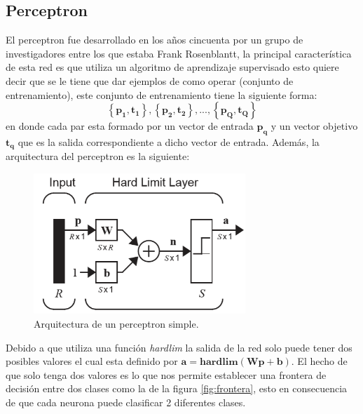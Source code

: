 \documentclass[12pt, titlepage]{article}
\begin{document}
        \subsection{Perceptron}
        El perceptron fue desarrollado en los años cincuenta por un grupo de investigadores entre los que estaba Frank Rosenblantt, la principal característica de esta red es que utiliza un algoritmo de aprendizaje supervisado esto quiere decir que se le tiene que dar ejemplos de como operar (conjunto de entrenamiento), este conjunto de entrenamiento tiene la siguiente forma:
        \[ \left\lbrace \boldsymbol{p_1, t_1}\right\rbrace , \left\lbrace \boldsymbol{p_2, t_2}\right\rbrace , ... , \left\lbrace \boldsymbol{p_Q, t_Q}\right\rbrace  \]
        en donde cada par esta formado por un vector de entrada $\boldsymbol{p_q}$ y un vector objetivo $\boldsymbol{t_q}$ que es la salida correspondiente a dicho vector de entrada. \cite{libro1}
        Además, la arquitectura del perceptron es la siguiente:
        \begin{figure}[H]
            \begin{center}
                \includegraphics[width=8cm]{img/perceptron/perceptron.png}
                \caption{Arquitectura de un perceptron simple. \cite{libro1}}
                \label{fig:perpectron-diagrama}
            \end{center}
        \end{figure}
        Debido a que utiliza una función \emph{hardlim} la salida de la red solo puede tener dos posibles valores el cual esta definido por $\boldsymbol{a = hardlim(Wp+b)}$. El hecho de que solo tenga dos valores es lo que nos permite establecer una frontera de decisión entre dos clases como la de la figura \ref{fig:frontera}, esto en consecuencia de que cada neurona puede clasificar 2 diferentes clases.
\end{document}
